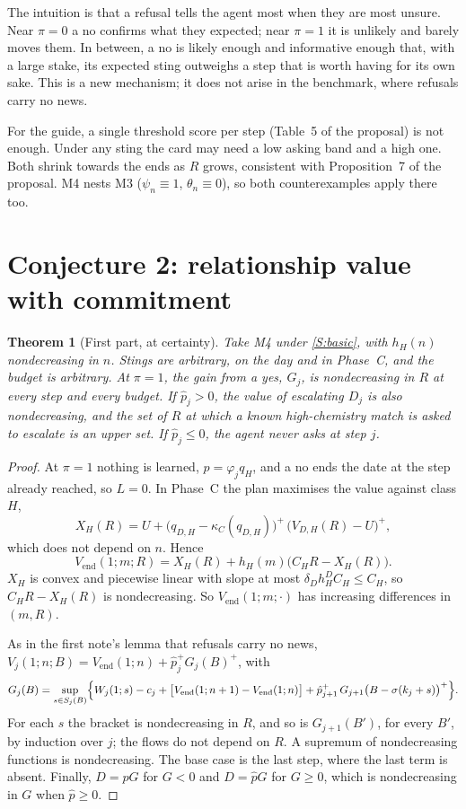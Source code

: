 \documentclass[11pt,a4paper]{article}
\newtheorem{theorem}{Theorem}
\theoremstyle{definition}
\theoremstyle{remark}
\newcommand{\Vend}{V_{\mathrm{end}}}
\newcommand{\pp}{\hat p}
\begin{document}
The intuition is that a refusal tells the agent most when they are most unsure. Near $\pi=0$ a no confirms what they expected; near $\pi=1$ it is unlikely and barely moves them. In between, a no is likely enough and informative enough that, with a large stake, its expected sting outweighs a step that is worth having for its own sake. This is a new mechanism; it does not arise in the benchmark, where refusals carry no news.

For the guide, a single threshold score per step (Table~5 of the proposal) is not enough. Under any sting the card may need a low asking band and a high one. Both shrink towards the ends as $R$ grows, consistent with Proposition~7 of the proposal. M4 nests M3 ($\psi_n\equiv1$, $\theta_n\equiv0$), so both counterexamples apply there too.

\section{Conjecture 2: relationship value with commitment}\label{sec:c2}

\begin{theorem}[First part, at certainty]\label{thm:c2a}
Take M4 under \ref{S:basic}, with $h_H(n)$ nondecreasing in $n$. Stings are arbitrary, on the day and in Phase~C, and the budget is arbitrary. At $\pi=1$, the gain from a yes, $G_j$, is nondecreasing in $R$ at every step and every budget. If $\pp_j>0$, the value of escalating $D_j$ is also nondecreasing, and the set of $R$ at which a known high-chemistry match is asked to escalate is an upper set. If $\pp_j\le0$, the agent never asks at step $j$.
\end{theorem}

\begin{proof}
At $\pi=1$ nothing is learned, $p=\varphi_jq_H$, and a no ends the date at the step already reached, so $L=0$. In Phase~C the plan maximises the value against class $H$,
\[
X_H(R)=U+\bigl(q_{D,H}-\kappa_C(q_{D,H})\bigr)^+\,\bigl(V_{D,H}(R)-U\bigr)^+ ,
\]
which does not depend on $n$. Hence
\[
\Vend(1;m;R)=X_H(R)+h_H(m)\bigl(C_HR-X_H(R)\bigr).
\]
$X_H$ is convex and piecewise linear with slope at most $\delta_Dh^D_HC_H\le C_H$, so $C_HR-X_H(R)$ is nondecreasing. So $\Vend(1;m;\cdot)$ has increasing differences in $(m,R)$.

As in the first note's lemma that refusals carry no news, $V_j(1;n;B)=\Vend(1;n)+\pp_j^+G_j(B)^+$, with
\[
G_j(B)=\sup_{s\in S_j(B)}\Bigl\{W_j(1;s)-c_j+\bigl[\Vend(1;n+1)-\Vend(1;n)\bigr]+\pp_{j+1}^+\,G_{j+1}\bigl(B-\sigma(k_j+s)\bigr)^+\Bigr\}.
\]
For each $s$ the bracket is nondecreasing in $R$, and so is $G_{j+1}(B')$, for every $B'$, by induction over $j$; the flows do not depend on $R$. A supremum of nondecreasing functions is nondecreasing. The base case is the last step, where the last term is absent. Finally, $D=pG$ for $G<0$ and $D=\pp G$ for $G\ge0$, which is nondecreasing in $G$ when $\pp\ge0$.
\end{proof}
\end{document}
